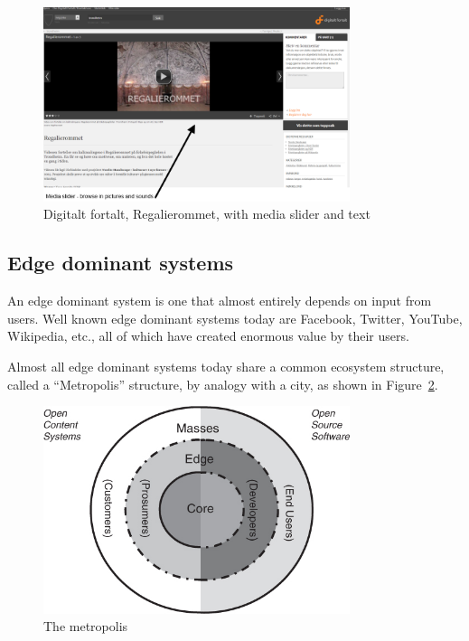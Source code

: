 \documentclass[11pt]{book}
\begin{document}
\begin{figure}[H]
      \centering
      \includegraphics[width=0.8\textwidth]{Figures/Prestudy/digitaltfortaltRegalierommet.png}
      \caption{Digitalt fortalt, Regalierommet, with media slider and text}
      \label{fig:pre_fortaltRegalierommet}
\end{figure}

\subsection{Edge dominant systems}
An edge dominant system is one that almost entirely depends on input from users. Well known edge dominant systems today are Facebook, Twitter, YouTube, Wikipedia, etc., all of which have created enormous value by their users. 

Almost all edge dominant systems today share a common ecosystem structure, called a ``Metropolis'' structure, by analogy with a city, as shown in Figure~\ref{fig:pre_edgeMetropolis}.

\begin{figure}[H]
      \centering
      \includegraphics[width=0.8\textwidth]{Figures/Prestudy/metropolis.jpg}
      \caption{The metropolis}
      \label{fig:pre_edgeMetropolis}
\end{figure}
\end{document}
